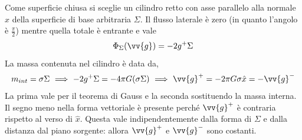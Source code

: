 \documentclass[a4paper, oneside]{book}
\begin{document}
Come superficie chiusa si sceglie un cilindro retto con asse parallelo alla normale $\hat{x}$ 
della superficie di base arbitraria $\Sigma$. Il flusso laterale 
è zero (in quanto l'angolo è $\frac{\pi}{2}$) mentre quella totale è 
entrante e vale 
\begin{gather*}
    \Phi_\Sigma(\vv{g} ) = -2g^{+}\Sigma
\end{gather*}  
La massa contenuta nel cilindro è data da,
\begin{gather*}
    m_{int} = \sigma\Sigma \ \Longrightarrow \ -2g^{+} \Sigma = -4\pi G(\sigma \Sigma) \ \Longrightarrow \  \vv{g}^{+} = -2\pi G \sigma \hat{x} = -\vv{g}^{-}   
\end{gather*}
La prima vale per il teorema di Gauss e la seconda sostituendo la massa interna. Il segno 
meno nella forma vettoriale è presente perché $\vv{g}^{+}$ è contraria rispetto al verso di $\hat{x}$.  
Questa vale indipendentemente dalla forma di $\Sigma$ e dalla distanza dal 
piano sorgente: allora $\vv{g}^{+}$ e $\vv{g}^{-}$ sono costanti.
\end{document}
